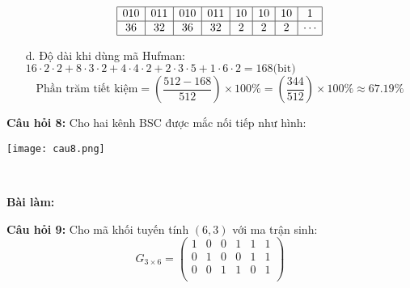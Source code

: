 \documentclass[12pt]{article}
\begin{document}
\begin{itemize}
   \[
    \begin{array}{|c|c|c|c|c|c|c|c|}
    \hline
    010 & 011 & 010 & 011 & 10 & 10 & 10 & 1 \\
    \hline
    36 & 32 & 36 & 32 & 2 & 2 & 2 & \cdots \\
    \hline
    \end{array}
    \]
    \item[d.] Độ dài khi dùng mã Hufman:\\
    $16\cdot2 \cdot2 + 8\cdot 3 \cdot2 + 4\cdot4\cdot2 + 2\cdot3\cdot5+ 1\cdot6\cdot2 = 168 \text{(bit)}$\\
    \[
    \text{Phần trăm tiết kiệm} = \left( \frac{512 - 168}{512} \right) \times 100\% = \left( \frac{344}{512} \right) \times 100\% \approx 67.19\%
    \]

\end{itemize}



\newpage
\textbf{Câu hỏi 8:} Cho hai kênh BSC được mắc nối tiếp như hình: 

\texttt{[image: cau8.png]}


    \\

\par\noindent\textbf{Bài làm:}



\newpage

\textbf{Câu hỏi 9:} 
Cho mã khối tuyến tính $(6,3)$ với ma trận sinh:
\[
G_{3 \times 6} =
\begin{pmatrix}
1 & 0 & 0 & 1 & 1 & 1 \\
0 & 1 & 0 & 0 & 1 & 1 \\
0 & 0 & 1 & 1 & 0 & 1 \\
\end{pmatrix}
\]
\end{document}
